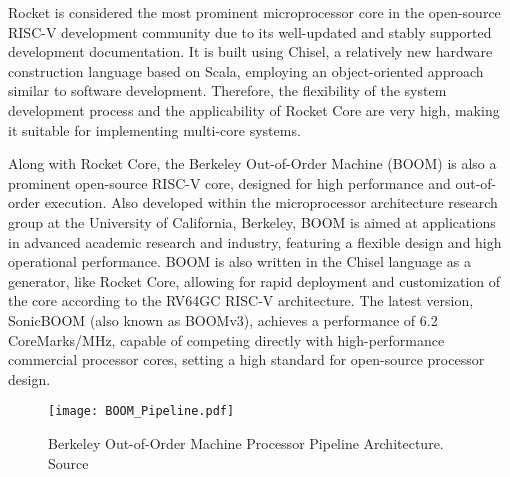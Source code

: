 Rocket is considered the most prominent microprocessor core in the open-source RISC-V development community due to its well-updated and stably supported development documentation. It is built using Chisel, a relatively new hardware construction language based on Scala, employing an object-oriented approach similar to software development. Therefore, the flexibility of the system development process and the applicability of Rocket Core are very high, making it suitable for implementing multi-core systems.

Along with Rocket Core, the Berkeley Out-of-Order Machine (BOOM) \cite{celio2015boom, celio2016boom_spec,celio_phdthesis_2018boom} is also a prominent open-source RISC-V core, designed for high performance and out-of-order execution. Also developed within the microprocessor architecture research group at the University of California, Berkeley, BOOM is aimed at applications in advanced academic research and industry, featuring a flexible design and high operational performance. BOOM is also written in the Chisel language as a generator, like Rocket Core, allowing for rapid deployment and customization of the core according to the RV64GC RISC-V architecture. The latest version, SonicBOOM \cite{zhao2020sonicboom} (also known as BOOMv3), achieves a performance of 6.2 CoreMarks/MHz, capable of competing directly with high-performance commercial processor cores, setting a high standard for open-source processor design.

\begin{figure}[h!]
    \centering
    \texttt{[image: BOOM\_Pipeline.pdf]}
    \caption{Berkeley Out-of-Order Machine Processor Pipeline Architecture. Source \cite{celio_phdthesis_2018boom}}
    \label{fig:boom_architecture}
\end{figure}

